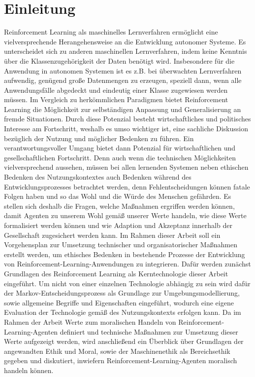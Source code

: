 \chapter{Einleitung} \label{chap:einleitung}
Reinforcement Learning als maschinelles Lernverfahren ermöglicht eine vielversprechende Herangehensweise an die Entwicklung autonomer Systeme.
Es unterscheidet sich zu anderen maschinellen Lernverfahren, indem keine Kenntnis über die Klassenzugehörigkeit der Daten benötigt wird.
Insbesondere für die Anwendung in autonomen Systemen ist es z.B. bei überwachten Lernverfahren aufwendig, genügend große Datenmengen zu erzeugen, speziell dann, wenn alle Anwendungsfälle abgedeckt und eindeutig einer Klasse zugewiesen werden müssen.
Im Vergleich zu herkömmlichen Paradigmen bietet Reinforcement Learning die Möglichkeit zur selbständigen Anpassung und Generalisierung an fremde Situationen. 
Durch diese Potenzial besteht wirtschaftliches und politisches Interesse am Fortschritt, weshalb es umso wichtiger ist, eine sachliche Diskussion bezüglich der Nutzung und möglicher Bedenken zu führen.
Ein verantwortungsvoller Umgang bietet dann Potenzial für wirtschaftlichen und gesellschaftlichen Fortschritt.
Denn auch wenn die technischen Möglichkeiten vielversprechend aussehen, müssen bei allen lernenden Systemen neben ethischen Bedenken des Nutzungskontextes auch Bedenken während des Entwicklungsprozesses betrachtet werden, denn Fehlentscheidungen können fatale Folgen \cite{amodei2016}\cite{hawkins} haben und so das Wohl und die Würde des Menschen gefährden.
Es stellen sich deshalb die Fragen, welche Maßnahmen ergriffen werden können, damit Agenten zu unserem Wohl gemäß unserer Werte handeln, wie diese Werte formalisiert werden können und wie Adaption und Akzeptanz innerhalb der Gesellschaft zugesichert werden kann.
\ab 
Im Rahmen dieser Arbeit soll ein Vorgehensplan zur Umsetzung technischer und organisatorischer Maßnahmen erstellt werden, um ethisches Bedenken in bestehende Prozesse der Entwicklung von Reinforcement-Learning-Anwendungen zu integrieren.
Dafür werden zunächst Grundlagen des Reinforcement Learning als Kerntechnologie dieser Arbeit eingeführt.
Um nicht von einer einzelnen Technologie abhängig zu sein wird dafür der Markov-Entscheidungsprozess als Grundlage zur Umgebungsmodellierung, sowie allgemeine Begriffe und Eigenschaften eingeführt, wodurch eine eigene Evaluation der Technologie gemäß des Nutzungskontexts erfolgen kann.
Da im Rahmen der Arbeit Werte zum moralischen Handeln von Reinforcement-Learning-Agenten definiert und technische Maßnahmen zur Umsetzung dieser Werte aufgezeigt werden, wird anschließend ein Überblick über Grundlagen der angewandten Ethik und Moral, sowie der Maschinenethik als Bereichsethik gegeben und diskutiert, inwiefern Reinforcement-Learning-Agenten moralisch handeln können.
